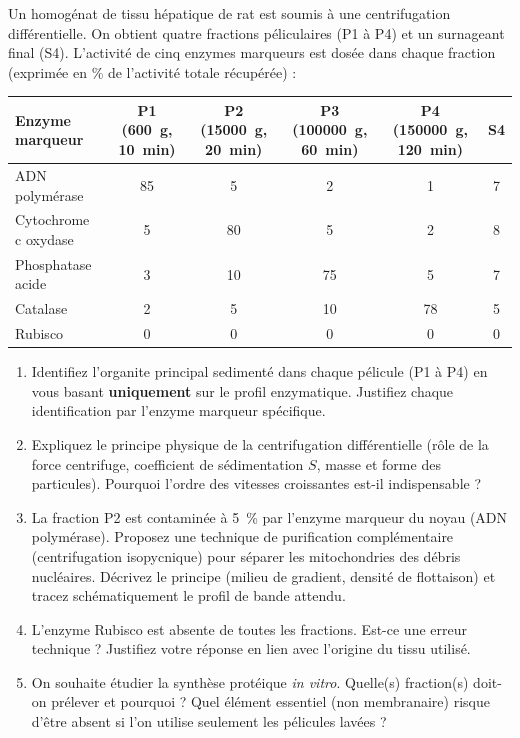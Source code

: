 \documentclass[11pt]{article}
\begin{document}
\begin{exercice}
Un homogénat de tissu hépatique de rat est soumis à une centrifugation différentielle. On obtient quatre fractions péliculaires (P1 à P4) et un surnageant final (S4). L'activité de cinq enzymes marqueurs est dosée dans chaque fraction (exprimée en \% de l'activité totale récupérée) :

\begin{tabular}{lccccc}
\toprule
\textbf{Enzyme marqueur} & \textbf{P1 (\SI{600}{g}, \SI{10}{min})} & \textbf{P2 (\SI{15000}{g}, \SI{20}{min})} & \textbf{P3 (\SI{100000}{g}, \SI{60}{min})} & \textbf{P4 (\SI{150000}{g}, \SI{120}{min})} & \textbf{S4} \\
\midrule
ADN polymérase & 85 & 5 & 2 & 1 & 7 \\
Cytochrome c oxydase & 5 & 80 & 5 & 2 & 8 \\
Phosphatase acide & 3 & 10 & 75 & 5 & 7 \\
Catalase & 2 & 5 & 10 & 78 & 5 \\
Rubisco & 0 & 0 & 0 & 0 & 0 \\
\bottomrule
\end{tabular}

\begin{enumerate}
    \item Identifiez l'organite principal sedimenté dans chaque pélicule (P1 à P4) en vous basant \textbf{uniquement} sur le profil enzymatique. Justifiez chaque identification par l'enzyme marqueur spécifique.
    \item Expliquez le principe physique de la centrifugation différentielle (rôle de la force centrifuge, coefficient de sédimentation $S$, masse et forme des particules). Pourquoi l'ordre des vitesses croissantes est-il indispensable ?
    \item La fraction P2 est contaminée à \SI{5}{\%} par l'enzyme marqueur du noyau (ADN polymérase). Proposez une technique de purification complémentaire (centrifugation isopycnique) pour séparer les mitochondries des débris nucléaires. Décrivez le principe (milieu de gradient, densité de flottaison) et tracez schématiquement le profil de bande attendu.
    \item L'enzyme Rubisco est absente de toutes les fractions. Est-ce une erreur technique ? Justifiez votre réponse en lien avec l'origine du tissu utilisé.
    \item On souhaite étudier la synthèse protéique \textit{in vitro}. Quelle(s) fraction(s) doit-on prélever et pourquoi ? Quel élément essentiel (non membranaire) risque d'être absent si l'on utilise seulement les pélicules lavées ?
\end{enumerate}
\end{exercice}
\end{document}
